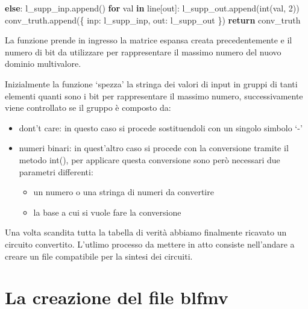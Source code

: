 \documentclass[
]{book}
\newenvironment{Shaded}{\begin{snugshade}}{\end{snugshade}}
\newcommand{\BuiltInTok}[1]{#1}
\newcommand{\ControlFlowTok}[1]{\textcolor[rgb]{0.13,0.29,0.53}{\textbf{#1}}}
\newcommand{\DecValTok}[1]{\textcolor[rgb]{0.00,0.00,0.81}{#1}}
\newcommand{\KeywordTok}[1]{\textcolor[rgb]{0.13,0.29,0.53}{\textbf{#1}}}
\newcommand{\NormalTok}[1]{#1}
\newcommand{\StringTok}[1]{\textcolor[rgb]{0.31,0.60,0.02}{#1}}
\providecommand{\tightlist}{%
  \setlength{\itemsep}{0pt}\setlength{\parskip}{0pt}}
\begin{document}
\begin{Shaded}
\begin{Highlighting}[]
        \ControlFlowTok{else}\NormalTok{:}
\NormalTok{          l\_supp\_inp.append(}\StringTok{\textquotesingle{}{-}\textquotesingle{}}\NormalTok{)}
      \ControlFlowTok{for}\NormalTok{ val }\KeywordTok{in}\NormalTok{ line[}\StringTok{\textquotesingle{}out\textquotesingle{}}\NormalTok{]:}
\NormalTok{        l\_supp\_out.append(}\BuiltInTok{int}\NormalTok{(val, }\DecValTok{2}\NormalTok{))}
\NormalTok{      conv\_truth.append(\{}
        \StringTok{\textquotesingle{}inp\textquotesingle{}}\NormalTok{:  l\_supp\_inp,}
        \StringTok{\textquotesingle{}out\textquotesingle{}}\NormalTok{:  l\_supp\_out}
\NormalTok{      \})}
  \ControlFlowTok{return}\NormalTok{ conv\_truth}
\end{Highlighting}
\end{Shaded}

La funzione prende in ingresso la matrice espansa creata precedentemente e il numero di bit da utilizzare per rappresentare il massimo numero del nuovo dominio multivalore.

\newpage

Inizialmente la funzione `spezza' la stringa dei valori di input in gruppi di tanti elementi quanti sono i bit per rappresentare il massimo numero, successivamente viene controllato se il gruppo è composto da:

\begin{itemize}
\tightlist
\item
  dont't care: in questo caso si procede sostituendoli con un singolo simbolo `-'
\item
  numeri binari: in quest'altro caso si procede con la conversione tramite il metodo int(), per applicare questa conversione sono però necessari due parametri differenti:

  \begin{itemize}
  \tightlist
  \item
    un numero o una stringa di numeri da convertire
  \item
    la base a cui si vuole fare la conversione
  \end{itemize}
\end{itemize}

Una volta scandita tutta la tabella di verità abbiamo finalmente ricavato un circuito convertito. L'utlimo processo da mettere in atto consiste nell'andare a creare un file compatibile per la sintesi dei circuiti.

\hypertarget{la-creazione-del-file-blfmv}{%
\section{La creazione del file blfmv}\label{la-creazione-del-file-blfmv}}
\end{document}
